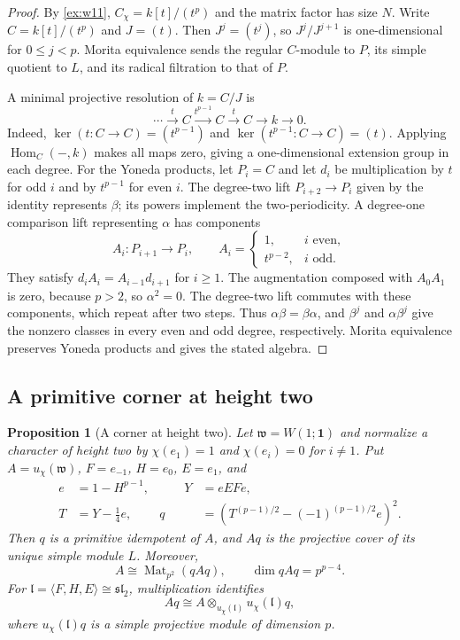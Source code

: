 \documentclass[11pt,reqno]{amsart}
\newtheorem{proposition}[proposition]{Proposition}
\theoremstyle{definition}
\theoremstyle{remark}
\theoremstyle{definition}
\newcommand{\Mat}{\operatorname{Mat}}
\newcommand{\Hom}{\operatorname{Hom}}
\begin{document}
\begin{proof}
By \cref{ex:w11}, $C_\chi=k[t]/(t^p)$ and the matrix factor has size $N$.
Write $C=k[t]/(t^p)$ and $J=(t)$. Then
$J^j=(t^j)$, so $J^j/J^{j+1}$ is one-dimensional for $0\le j<p$.
Morita equivalence sends the regular $C$-module to $P$, its simple
quotient to $L$, and its radical filtration to that of $P$.

A minimal projective resolution of $k=C/J$ is
\[
 \cdots\xrightarrow{t}C\xrightarrow{t^{p-1}}C
 \xrightarrow{t}C\longrightarrow k\longrightarrow0.
\]
Indeed, $\ker(t:C\to C)=(t^{p-1})$ and
$\ker(t^{p-1}:C\to C)=(t)$. Applying $\Hom_C(-,k)$ makes all
maps zero, giving a one-dimensional extension group in each degree.
For the Yoneda products, let $P_i=C$ and let $d_i$ be multiplication
by $t$ for odd $i$ and by $t^{p-1}$ for even $i$.
The degree-two lift $P_{i+2}\to P_i$ given by the identity represents
$\beta$; its powers implement the two-periodicity. A degree-one
comparison lift representing $\alpha$ has components
\[
 A_i:P_{i+1}\to P_i,\qquad
 A_i=\begin{cases}1,&i\text{ even},\\t^{p-2},&i\text{ odd}.
 \end{cases}
\]
They satisfy $d_iA_i=A_{i-1}d_{i+1}$ for $i\ge1$.
The augmentation composed with $A_0A_1$ is zero, because $p>2$,
so $\alpha^2=0$. The degree-two lift commutes with these components,
which repeat after two steps. Thus $\alpha\beta=\beta\alpha$,
and $\beta^j$ and $\alpha\beta^j$ give the nonzero classes in every
even and odd degree, respectively. Morita equivalence preserves
Yoneda products and gives the stated algebra.
\end{proof}


\subsection{A primitive corner at height two}

\begin{proposition}[A corner at height two]
\label{prop:w11-height-two-corner}
Let $\mathfrak w=W(1;\mathbf1)$ and normalize a character of height two
by $\chi(e_1)=1$ and $\chi(e_i)=0$ for $i\ne1$. Put
$A=u_\chi(\mathfrak w)$, $F=e_{-1}$, $H=e_0$, $E=e_1$, and
\[
\begin{aligned}
 e&=1-H^{p-1},&\qquad Y&=eEF e,\\
 T&=Y-\tfrac14e,& q&=\left(T^{(p-1)/2}-(-1)^{(p-1)/2}e\right)^2.
\end{aligned}
\]
Then $q$ is a primitive idempotent of $A$, and $Aq$ is the projective
cover of its unique simple module $L$. Moreover,
\[
 A\cong\Mat_{p^2}(qAq),\qquad \dim qAq=p^{p-4}.
\]
For $\mathfrak l=\langle F,H,E\rangle\cong\mathfrak{sl}_2$,
multiplication identifies
\[
 Aq\cong A\otimes_{u_\chi(\mathfrak l)}u_\chi(\mathfrak l)q,
\]
where $u_\chi(\mathfrak l)q$ is a simple projective module of dimension $p$.
\end{proposition}
\end{document}

